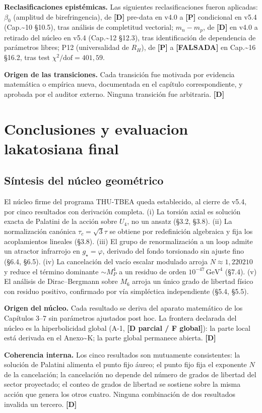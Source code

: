 ﻿\documentclass[11pt,letterpaper]{article}
\begin{document}
\textbf{Reclasificaciones epistémicas.} Las siguientes reclasificaciones fueron aplicadas: $\beta_0$ (amplitud de birefringencia), de \textbf{[D]} pre-data en v4.0 a \textbf{[P]} condicional en v5.4 (Cap.\textasciitilde{}10 §10.5), tras análisis de completitud vectorial; $m_n - m_p$, de \textbf{[D]} en v4.0 a retirado del núcleo en v5.4 (Cap.\textasciitilde{}12 §12.3), tras identificación de dependencia de parámetros libres; P12 (universalidad de $R_H$), de \textbf{[P]} a \textbf{[FALSADA]} en Cap.\textasciitilde{}16 §16.2, tras test $\chi^2/\text{dof} = 401{,}59$.

\textbf{Origen de las transiciones.} Cada transición fue motivada por evidencia matemática o empírica nueva, documentada en el capítulo correspondiente, y aprobada por el auditor externo. Ninguna transición fue arbitraria. \textbf{[D]}

\section{Conclusiones y evaluacion lakatosiana final}
\subsection{Síntesis del núcleo geométrico}
El núcleo firme del programa THU-TBEA queda establecido, al cierre de v5.4, por cinco resultados con derivación completa. (i) La torsión axial es solución exacta de Palatini de la acción sobre $U_4$, no un ansatz (§3.2, §3.8). (ii) La normalización canónica $\tau_c = \sqrt{3}\tau$ se obtiene por redefinición algebraica y fija los acoplamientos lineales (§3.8). (iii) El grupo de renormalización a un loop admite un atractor infrarrojo en $g_\star = \varphi$, derivado del fondo torsionado sin ajuste fino (§6.4, §6.5). (iv) La cancelación del vacío escalar modulado arroja $N \approx 1{,}220210$ y reduce el término dominante $\sim M_P^4$ a un residuo de orden $10^{-47}\,\text{GeV}^4$ (§7.4). (v) El análisis de Dirac--Bergmann sobre $M_6$ arroja un único grado de libertad físico con residuo positivo, confirmado por vía simpléctica independiente (§5.4, §5.5).

\textbf{Origen del núcleo.} Cada resultado se deriva del aparato matemático de los Capítulos 3--7 sin parámetros ajustados post hoc. La frontera declarada del núcleo es la hiperbolicidad global (A-1, \textbf{[D parcial / F global]}): la parte local está derivada en el Anexo\textasciitilde{}K; la parte global permanece abierta. \textbf{[D]}

\textbf{Coherencia interna.} Los cinco resultados son mutuamente consistentes: la solución de Palatini alimenta el punto fijo áureo; el punto fijo fija el exponente $N$ de la cancelación; la cancelación no depende del número de grados de libertad del sector proyectado; el conteo de grados de libertad se sostiene sobre la misma acción que genera los otros cuatro. Ninguna combinación de dos resultados invalida un tercero. \textbf{[D]}
\end{document}
